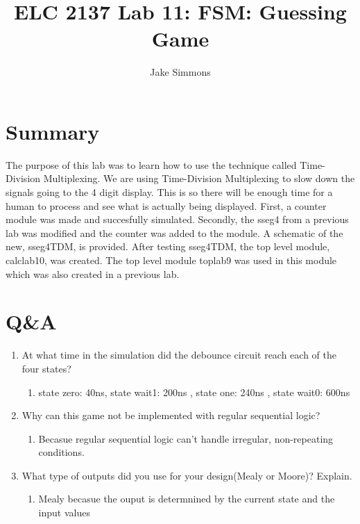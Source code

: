 \documentclass[11pt]{article}
\begin{document}
\title{ELC 2137 Lab 11: FSM: Guessing Game}
\author{Jake Simmons}

\maketitle


\section*{Summary}

The purpose of this lab was to learn how to use the technique called Time-Division Multiplexing. We are using Time-Division Multiplexing to slow down the signals going to the 4 digit display. This is so there will be enough time for a human to process and see what is actually being displayed. First, a counter module was made and succesfully simulated. Secondly, the sseg4 from a previous lab was modified and the counter was added to the module. A schematic of the new, sseg4TDM, is provided. After testing sseg4TDM, the top level module, calclab10, was created. The top level module toplab9 was used in this module which was also created in a previous lab.  

\clearpage
\section*{Q\&A}

\begin{enumerate}
		\item At what time in the simulation did the debounce circuit reach each of the four states?
		\begin{enumerate}
			\item 	state zero: 40ns, state wait1: 200ns , state one: 240ns , state wait0: 600ns 
		\end{enumerate}
	
	\item Why can this game not be implemented with regular sequential logic?
		\begin{enumerate}
			\item 	Becasue regular sequential logic can't handle irregular, non-repeating conditions.
		\end{enumerate}

	\item What type of outputs did you use for your design(Mealy or Moore)? Explain.
	\begin{enumerate}
		\item Mealy becasue the ouput is determnined by the current state and the input values
	\end{enumerate}
\end{enumerate}
\end{document}
